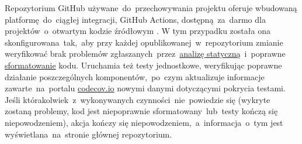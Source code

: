 Repozytorium GitHub używane~do~przechowywania projektu oferuje wbudowaną platformę~do~ciągłej integracji, GitHub Actions, dostępną~za~darmo dla projektów~o~otwartym kodzie źródłowym \cite{RoundSpot_Actions}. W tym przypadku została ona skonfigurowana~tak,~aby przy każdej opublikowanej~w~repozytorium zmianie weryfikować brak problemów zgłaszanych~przez~\hyperref[par:static_analysis]{analizę statyczną}~i~poprawne \hyperref[par:dart_format]{sformatowanie} kodu. Uruchamia też testy jednostkowe, weryfikując poprawne działanie poszczególnych komponentów,~po~czym aktualizuje informacje zawarte~na~portalu \href{https://codecov.io/}{codecov.io} \cite{RS_Coverage} nowymi danymi dotyczącymi pokrycia testami. Jeśli którakolwiek~z~wykonywanych czynności~nie~powiedzie się (wykryte zostaną problemy, kod jest niepoprawnie sformatowany~lub~testy kończą się niepowodzeniem), akcja kończy się niepowodzeniem,~a~informacja~o~tym jest wyświetlana~na~stronie głównej repozytorium.
